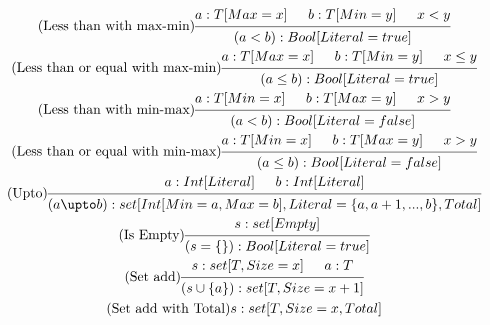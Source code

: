 \documentclass{article}
\begin{document}
\begin{gather}
    \tag{Less than with max-min}
    \begin{prooftree}
        \hypo{a: T[Max=x]}
        \hypo{b : T[Min=y]}
        \hypo{x < y}
        \infer3{(a < b): Bool[Literal=true]}
    \end{prooftree}
    \\
    \tag{Less than or equal with max-min}
    \begin{prooftree}
        \hypo{a: T[Max=x]}
        \hypo{b : T[Min=y]}
        \hypo{x \leq y}
        \infer3{(a \leq b): Bool[Literal=true]}
    \end{prooftree}
    \\
    \tag{Less than with min-max}
    \begin{prooftree}
        \hypo{a: T[Min=x]}
        \hypo{b : T[Max=y]}
        \hypo{x > y}
        \infer3{(a < b): Bool[Literal=false]}
    \end{prooftree}
    \\
    \tag{Less than or equal with min-max}
    \begin{prooftree}
        \hypo{a: T[Min=x]}
        \hypo{b : T[Max=y]}
        \hypo{x > y}
        \infer3{(a \leq b): Bool[Literal=false]}
    \end{prooftree}
    \\
    \tag{Upto}
    \begin{prooftree}
        \hypo{a: Int[Literal]}
        \hypo{b: Int[Literal]}
        \infer2{(a \upto b): set[Int[Min=a, Max=b], Literal=\{a, a+1, ..., b\}, Total]}
    \end{prooftree} %
    \\
    \tag{Is Empty}
    \begin{prooftree}
        \hypo{s: set[Empty]}
        \infer1{(s = \{\}): Bool[Literal=true]}
    \end{prooftree}
    \\
    \tag{Set add}
    \begin{prooftree}
        \hypo{s: set[T, Size=x]}
        \hypo{a: T}
        \infer2{(s \cup \{a\}): set[T, Size=x+1]} %
    \end{prooftree}
    \\
    \tag{Set add with Total}
    \begin{prooftree}
        \hypo{s: set[T, Size=x, Total]}

\end{prooftree}
\end{gather}
\end{document}
